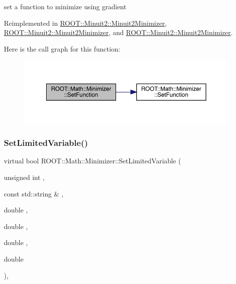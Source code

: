 set a function to minimize using gradient 



Reimplemented in \mbox{\hyperlink{classROOT_1_1Minuit2_1_1Minuit2Minimizer_aeb98c40cf3486fe8fb9bec4da0f7942e}{R\+O\+O\+T\+::\+Minuit2\+::\+Minuit2\+Minimizer}}, \mbox{\hyperlink{classROOT_1_1Minuit2_1_1Minuit2Minimizer_aeb98c40cf3486fe8fb9bec4da0f7942e}{R\+O\+O\+T\+::\+Minuit2\+::\+Minuit2\+Minimizer}}, and \mbox{\hyperlink{classROOT_1_1Minuit2_1_1Minuit2Minimizer_aeb98c40cf3486fe8fb9bec4da0f7942e}{R\+O\+O\+T\+::\+Minuit2\+::\+Minuit2\+Minimizer}}.

Here is the call graph for this function\+:
\nopagebreak
\begin{figure}[H]
\begin{center}
\leavevmode
\includegraphics[width=350pt]{dc/dc4/classROOT_1_1Math_1_1Minimizer_a1d9ff15aa732e518a60a05dcbd82c34a_cgraph}
\end{center}
\end{figure}
\mbox{\label{classROOT_1_1Math_1_1Minimizer_a4303530cbb62ceb7cf9c9ebcbde530c2}} 
\subsubsection{\texorpdfstring{SetLimitedVariable()}{SetLimitedVariable()}\hspace{0.1cm}{\footnotesize\ttfamily [1/3]}}
{\footnotesize\ttfamily virtual bool R\+O\+O\+T\+::\+Math\+::\+Minimizer\+::\+Set\+Limited\+Variable (\begin{DoxyParamCaption}\item[{unsigned int}]{,  }\item[{const std\+::string \&}]{,  }\item[{double}]{,  }\item[{double}]{,  }\item[{double}]{,  }\item[{double}]{ }\end{DoxyParamCaption})\hspace{0.3cm}{\ttfamily [inline]}, {\ttfamily [virtual]}}



